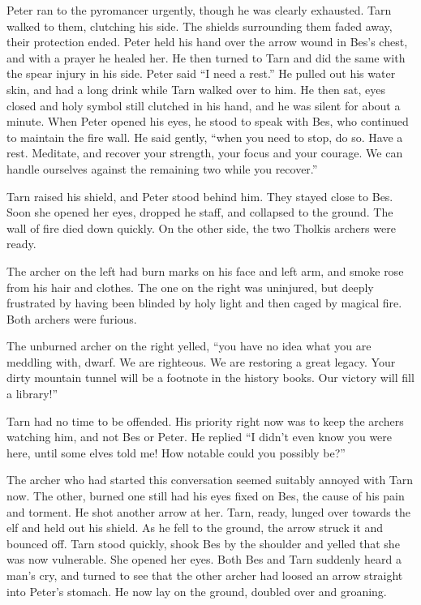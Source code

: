 Peter ran to the pyromancer urgently, though he was clearly exhausted.  Tarn walked to them, clutching his side.  The shields surrounding them faded away, their protection ended.  Peter held his hand over the arrow wound in Bes's chest, and with a prayer he healed her.  He then turned to Tarn and did the same with the spear injury in his side.  Peter said ``I need a rest.''  He pulled out his water skin, and had a long drink while Tarn walked over to him.  He then sat, eyes closed and holy symbol still clutched in his hand, and he was silent for about a minute.  When Peter opened his eyes, he stood to speak with Bes, who continued to maintain the fire wall.  He said gently, ``when you need to stop, do so.  Have a rest.  Meditate, and recover your strength, your focus and your courage.  We can handle ourselves against the remaining two while you recover.''

Tarn raised his shield, and Peter stood behind him.  They stayed close to Bes.  Soon she opened her eyes, dropped he staff, and collapsed to the ground.  The wall of fire died down quickly.  On the other side, the two Tholkis archers were ready.

The archer on the left had burn marks on his face and left arm, and smoke rose from his hair and clothes.  The one on the right was uninjured, but deeply frustrated by having been blinded by holy light and then caged by magical fire.  Both archers were furious.

The unburned archer on the right yelled, ``you have no idea what you are meddling with, dwarf.  We are righteous.  We are restoring a great legacy.  Your dirty mountain tunnel will be a footnote in the history books.  Our victory will fill a library!''

Tarn had no time to be offended.  His priority right now was to keep the archers watching him, and not Bes or Peter.  He replied ``I didn't even know you were here, until some elves told me!  How notable could you possibly be?''

The archer who had started this conversation seemed suitably annoyed with Tarn now.  The other, burned one still had his eyes fixed on Bes, the cause of his pain and torment.  He shot another arrow at her.  Tarn, ready, lunged over towards the elf and held out his shield.  As he fell to the ground, the arrow struck it and bounced off.  Tarn stood quickly, shook Bes by the shoulder and yelled that she was now vulnerable.  She opened her eyes.  Both Bes and Tarn suddenly heard a man's cry, and turned to see that the other archer had loosed an arrow straight into Peter's stomach.  He now lay on the ground, doubled over and groaning.

